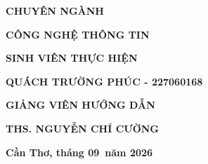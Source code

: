\documentclass[12pt,a4paper,oneside]{report}
\newcommand{\StudentName}{Quách Trường Phúc}
\newcommand{\StudentID}{227060168}
\newcommand{\FacultyAdvisor}{ThS. Nguyễn Chí Cường}
\newcommand{\MajorName}{CÔNG NGHỆ THÔNG TIN}
\newcommand{\ReportMonth}{09}
\newcommand{\ReportYear}{2026}
\begin{document}
\begin{titlepage}
\begin{center}
    \vspace{1.4cm}

    {\bfseries\fontsize{16pt}{19pt}\selectfont
      CHUYÊN NGÀNH
      \par}

    \vspace{0.15cm}

    {\bfseries\fontsize{16pt}{19pt}\selectfont
      \MajorName
      \par}



    \vspace{1.4cm}

    {\bfseries\fontsize{14pt}{17pt}\selectfont
      SINH VIÊN THỰC HIỆN
      \par}

    \vspace{0.15cm}

    {\bfseries\fontsize{14pt}{17pt}\selectfont
      \MakeUppercase{\StudentName} - \StudentID
      \par}



    \vspace{0.9cm}

    {\bfseries\fontsize{14pt}{17pt}\selectfont
      GIẢNG VIÊN HƯỚNG DẪN
      \par}

    \vspace{0.15cm}

    {\bfseries\fontsize{14pt}{17pt}\selectfont
      \MakeUppercase{\FacultyAdvisor}
      \par}



    \vfill

    {\bfseries\fontsize{13pt}{16pt}\selectfont
      Cần Thơ, tháng \ReportMonth\ năm \ReportYear
      \par}

  \end{center}

\end{titlepage}
\end{document}
